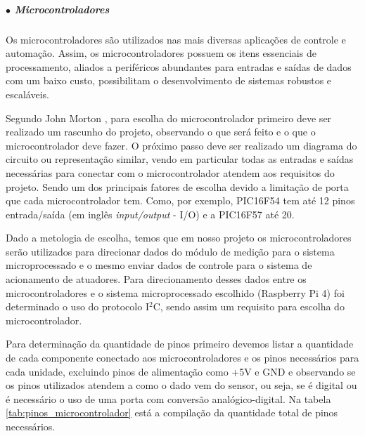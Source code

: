         
        
    
    \subparagraph*{$\bullet$ Microcontroladores} \hfill
    
    Os microcontroladores são utilizados nas mais diversas aplicações de controle e automação. Assim, os microcontroladores possuem os itens essenciais de processamento, aliados a periféricos abundantes para entradas e saídas de dados com um  baixo custo, possibilitam o desenvolvimento de sistemas robustos e escaláveis.
    
    Segundo John Morton \cite{morton2005pic}, para escolha do microcontrolador primeiro deve ser realizado um rascunho do projeto, observando o que será feito e o que o microcontrolador deve fazer. O próximo passo deve ser realizado um diagrama do circuito ou representação similar, vendo em particular todas as entradas e saídas necessárias para conectar com o microcontrolador atendem aos requisitos do projeto. Sendo um dos principais fatores de escolha devido a limitação de porta que cada microcontrolador tem. Como, por exemplo, PIC16F54 tem até 12 pinos entrada/saída (em inglês \textit{input/output} - I/O) e a PIC16F57 até 20.
    
    Dado a metologia de escolha, temos que em nosso projeto os microcontroladores serão utilizados para direcionar dados do módulo de medição para o sistema microprocessado e o mesmo enviar dados de controle para o sistema de acionamento de atuadores. Para direcionamento desses dados entre os microcontroladores e o sistema microprocessado escolhido (Raspberry Pi 4) foi determinado o uso do protocolo I$^2$C, sendo assim um requisito para escolha do microcontrolador.
    
    Para determinação da quantidade de pinos primeiro devemos listar a quantidade de cada componente conectado aos microcontroladores e os pinos necessários para cada unidade, excluindo pinos de alimentação como +5V e GND e observando se os pinos utilizados atendem a como o dado vem do sensor, ou seja, se é digital ou é necessário o uso de uma porta com conversão analógico-digital. Na tabela \ref{tab:pinos_microcontrolador} está a compilação da quantidade total de pinos necessários.
    
